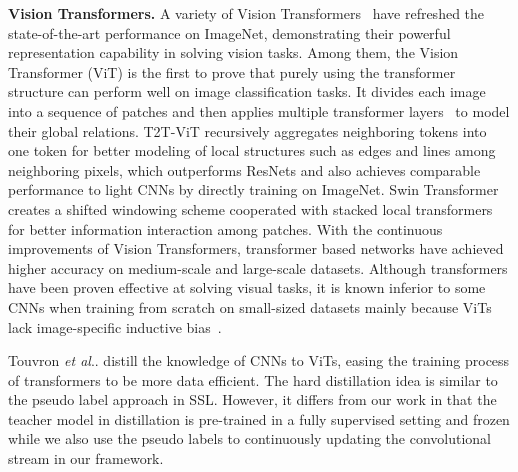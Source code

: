 \documentclass[runningheads]{llncs}
\makeatletter
\DeclareRobustCommand\onedot{\futurelet\@let@token\@onedot}
\def\@onedot{\ifx\@let@token.\else.\null\fi\xspace}
\def\etal{\emph{et al}\onedot}
\makeatother
\begin{document}
\textbf{Vision Transformers.} A variety of Vision Transformers~\cite{dosovitskiy2020image, yuan2021tokens, heo2021rethinking, wang2021pyramid, touvron2021training,wang2022bevt,wang2021efficient,li2022contextual} have refreshed the state-of-the-art performance on ImageNet, demonstrating their powerful representation capability in solving vision tasks. Among them, the Vision Transformer (ViT) \cite{dosovitskiy2020image} is the first to prove that purely using the transformer structure can perform well on image classification tasks. It divides each image into a sequence of patches and then applies multiple transformer layers~\cite{vaswani2017attention} to model their global relations.  T2T-ViT \cite{yuan2021tokens} recursively aggregates neighboring tokens into one token for better modeling of local structures such as edges and lines among neighboring pixels, which outperforms ResNets \cite{he2016deep} and also achieves comparable performance to light CNNs by directly training on ImageNet. Swin Transformer \cite{liu2021swin} creates a shifted windowing scheme cooperated with stacked local transformers for better information interaction among patches. With the continuous improvements of Vision Transformers, transformer based networks have achieved higher accuracy on medium-scale and large-scale datasets. Although transformers have been proven effective at solving visual tasks, it is known inferior to some CNNs when training from scratch on small-sized datasets mainly because ViTs lack image-specific inductive bias~\cite{dosovitskiy2020image}. 

Touvron \etal \cite{touvron2021training} distill the knowledge of CNNs to ViTs, easing the training process of transformers to be more data efficient. The hard distillation idea is similar to the pseudo label approach in SSL. However, it differs from our work in that the teacher model in distillation is pre-trained in a fully supervised setting and frozen while we also use the pseudo labels to continuously updating the convolutional stream in our framework.
\end{document}
